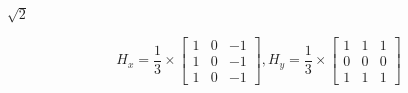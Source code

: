 \documentclass{article}
\begin{document}
$\sqrt{2}$ %


$$\begin{equation}
H_x=\frac{1}{3}\times{
\left[ \begin{array}{ccc}
1 & 0 & -1\\
1 & 0 & -1\\
1 & 0 & -1
\end{array} 
\right ]},
H_y=\frac{1}{3}\times{
\left[ \begin{array}{ccc}
1 & 1 & 1\\
0& 0 & 0\\
1 & 1 & 1
\end{array}
\right ]}
\end{equation}$$
\end{document}
